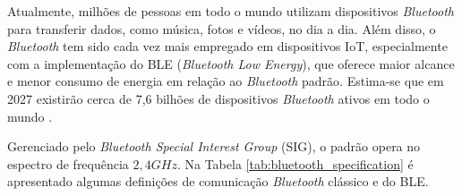 Atualmente, milhões de pessoas em todo o mundo utilizam dispositivos \textit{Bluetooth} para transferir dados, como música, fotos e vídeos, no dia a dia. Além disso, o \textit{Bluetooth} tem sido cada vez mais empregado em dispositivos IoT, especialmente com a implementação do BLE (\textit{Bluetooth Low Energy}), que oferece maior alcance e menor consumo de energia em relação ao \textit{Bluetooth} padrão. Estima-se que em 2027 existirão cerca de 7,6 bilhões de dispositivos \textit{Bluetooth} ativos em todo o mundo \cite{BluetoothSite}.


Gerenciado pelo \textit{Bluetooth Special Interest Group} (SIG), o padrão opera no espectro de frequência $2,4GHz$. Na Tabela \ref{tab:bluetooth_specification} é apresentado algumas definições de comunicação \textit{Bluetooth} clássico e do BLE.

\begin{table}[h!]
	\caption{Definições de \textit{Bluetooth} clássico e BLE}
	
	\label{tab:bluetooth_specification}
\end{table}


